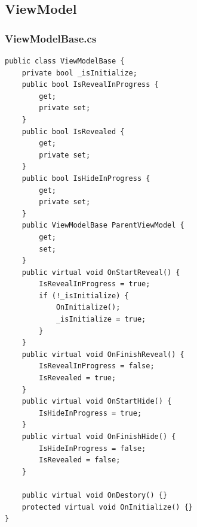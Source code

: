 \documentclass[9pt, b5paper]{article}
\begin{document}
\subsection{ViewModel}
\label{sec-6-5}
\subsubsection{ViewModelBase.cs}
\label{sec-6-5-1}
\begin{verbatim}
public class ViewModelBase {
    private bool _isInitialize;
    public bool IsRevealInProgress {
        get;
        private set;
    }
    public bool IsRevealed {
        get;
        private set;
    }
    public bool IsHideInProgress {
        get;
        private set;
    }
    public ViewModelBase ParentViewModel {
        get;
        set;
    }
    public virtual void OnStartReveal() {
        IsRevealInProgress = true;
        if (!_isInitialize) {
            OnInitialize();
            _isInitialize = true;
        }
    }
    public virtual void OnFinishReveal() {
        IsRevealInProgress = false;
        IsRevealed = true;
    }
    public virtual void OnStartHide() {
        IsHideInProgress = true;
    }
    public virtual void OnFinishHide() {
        IsHideInProgress = false;
        IsRevealed = false;
    }
    
    public virtual void OnDestory() {}
    protected virtual void OnInitialize() {}
}
\end{verbatim}
\end{document}
